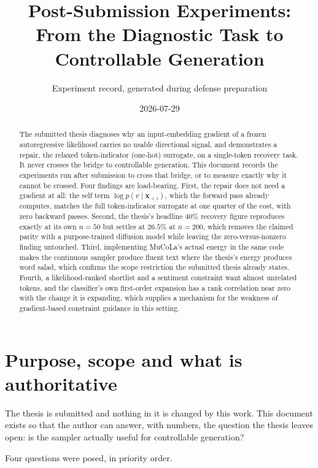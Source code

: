 \documentclass[11pt,a4paper]{article}
\title{Post-Submission Experiments:\\
From the Diagnostic Task to Controllable Generation}
\author{Experiment record, generated during defense preparation}
\date{2026-07-29}
\newcommand{\vx}{\bm{x}}
\begin{document}
\maketitle

\begin{abstract}
The submitted thesis diagnoses why an input-embedding gradient of a frozen
autoregressive likelihood carries no usable directional signal, and demonstrates a
repair, the relaxed token-indicator (one-hot) surrogate, on a single-token recovery
task. It never crosses the bridge to controllable generation. This document records the
experiments run after submission to cross that bridge, or to measure exactly why it
cannot be crossed. Four findings are load-bearing. First, the repair does not need a
gradient at all: the self term $\log p(v \mid \vx_{<i})$, which the forward pass already
computes, matches the full token-indicator surrogate at one quarter of the cost, with
zero backward passes. Second, the thesis's headline $40\%$ recovery figure reproduces
exactly at its own $n=50$ but settles at $26.5\%$ at $n=200$, which removes the claimed
parity with a purpose-trained diffusion model while leaving the zero-versus-nonzero
finding untouched. Third, implementing MuCoLa's actual energy in the same code makes the
continuous sampler produce fluent text where the thesis's energy produces word salad,
which confirms the scope restriction the submitted thesis already states. Fourth, a
likelihood-ranked shortlist and a sentiment constraint want almost unrelated tokens, and
the classifier's own first-order expansion has a rank correlation near zero with the
change it is expanding, which supplies a mechanism for the weakness of gradient-based
constraint guidance in this setting.
\end{abstract}

\tableofcontents

\section{Purpose, scope and what is authoritative}

The thesis is submitted and nothing in it is changed by this work. This document exists
so that the author can answer, with numbers, the question the thesis leaves open: is the
sampler actually useful for controllable generation?

Four questions were posed, in priority order.
\end{document}
